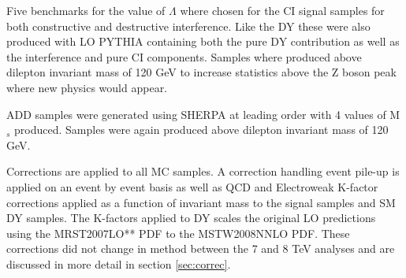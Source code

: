 	Five benchmarks for the value of $\Lambda$ where chosen for the CI signal samples for both constructive and destructive interference. Like the DY these were also produced with LO PYTHIA containing both the pure DY contribution as well as the interference and pure CI components. Samples where produced above dilepton invariant mass of 120 GeV to increase statistics above the Z boson peak where new physics would appear. 

	ADD samples were generated using SHERPA \cite{} at leading order with 4 values of M$_{s}$ produced. Samples were again produced above dilepton invariant mass of 120 GeV. 


	Corrections are applied to all MC samples. A correction handling event pile-up is applied on an event by event basis as well as QCD and Electroweak K-factor corrections applied as a function of invariant mass to the signal samples and SM DY samples. The K-factors applied to DY scales the original LO predictions using the MRST2007LO** \cite{} PDF to the MSTW2008NNLO \cite{} PDF. These corrections did not change in method between the 7 and 8 TeV analyses and are discussed in more detail in section \ref{sec:correc}.



